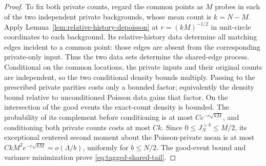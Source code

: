\documentclass[11pt,letterpaper]{article}
\begin{document}
\begin{proof}
To fix both private counts, regard the common points as
$M$ probes in each of the two independent private backgrounds,
whose mean count is $k=N-M$. Apply
Lemma~\ref{lem:relative-history-depoisson} at
$r=(kM)^{-1/2}$ in unit-circle coordinates to each background.
Its relative-history data determine all matching edges
incident to a common point: those edges are absent from
the corresponding private-only input. Thus the two data
sets determine the shared-edge process.
Conditional on the common locations, the private inputs
and their original counts are independent, so the two
conditional density bounds multiply. Passing to the prescribed
private parities costs only a bounded factor; equivalently the
density bound relative to unconditioned Poisson data gains that
factor. On the intersection of the good events the exact-count
density is bounded.
The probability of its complement before conditioning is
at most $Ce^{-c\sqrt{kM}}$, and conditioning both private
counts costs at most $Ck$.
Since $0\le J_N^{>b}\le M/2$, its exceptional centered
second moment about the Poisson-private mean is at most
$CkM^2e^{-c\sqrt{kM}}=o(\Lambda/b)$, uniformly for $b\le N/2$.
The good-event bound and variance minimization prove
\eqref{eq:tagged-shared-tail}.
\end{proof}
\end{document}
